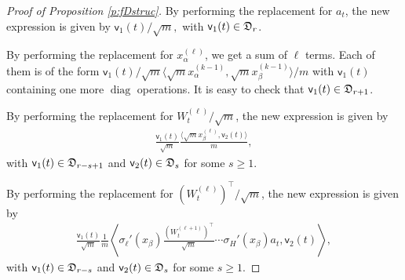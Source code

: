 \documentclass{article}
\numberwithin{equation}{section}
\newcommand{\fD}{{\frak D}}
\newcommand{\sfe}{{\mathsf e}}
\newcommand{\sfv}{{\mathsf v}}
\newcommand{\al}{\alpha}
\DeclareMathOperator{\diag}{diag}
\renewcommand{\leq}{\leqslant}
\renewcommand{\geq}{\geqslant}
\newcommand{\1}{\mathds{1}}
\theoremstyle{plain} %
\begin{document}
\begin{proof}[Proof of Proposition \ref{p:fDstruc}]
By performing the replacement for $a_t$, the new expression is given by
$
\sfv_1(t)/\sqrt m,
$
with $\sfv_1(t)\in \fD_r$.

By performing the replacement for $x_\al^{(\ell)}$, we get a sum of $\ell$ terms. Each of them is of the form
$\sfv_1(t)/\sqrt m\langle \sqrt m x_{\al}^{(k-1)},\sqrt m x_{\beta}^{(k-1)}\rangle/m
$ with $\sfv_1(t)$ containing one more $\diag$ operations. It is easy to check that $\sfv_1(t)\in \fD_{r+1}$.

By performing the replacement for $W_t^{(\ell)}/\sqrt m$, the new expression is given by 
\begin{align*}
\frac{ \sfv_1(t)}{\sqrt m}\frac{ \langle \sqrt m x_{\beta}^{(\ell)}, \sfv_2(t)\rangle}{m}, 
\end{align*}
with $\sfv_1(t)\in \fD_{r-s+1}$ and $\sfv_2(t)\in \fD_{s}$ for some $s\geq 1$.
%


By performing the replacement for $(W_t^{(\ell)})^\top/\sqrt m$, the new expression is given by
\begin{align*}
\frac{\sfv_1(t)}{\sqrt m}  \frac{1}{m}\left\langle \sigma_\ell'(x_{\beta}) \frac{(W_t^{(\ell+1)})^\top}{\sqrt m}\cdots \sigma_H' (x_{\beta})a_t, \sfv_2(t)\right\rangle,
\end{align*}
with $\sfv_1(t)\in \fD_{r-s}$ and $\sfv_2(t)\in \fD_{s}$ for some $s\geq 1$.



\end{proof}
\end{document}
